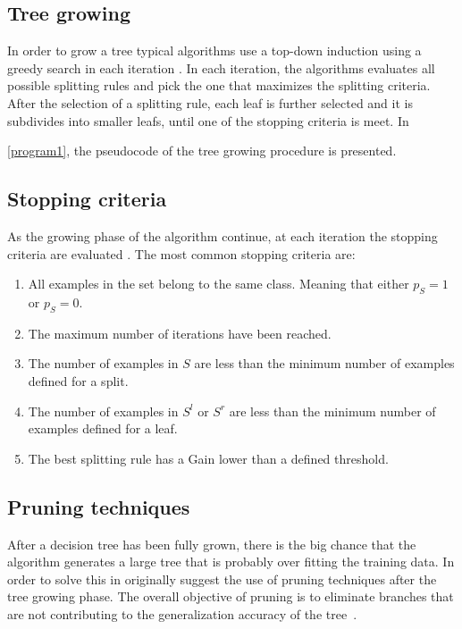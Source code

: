  \subsection{Tree growing}
 In order to grow a tree typical algorithms use a top-down induction using a greedy search in each
 iteration \citep{Rokach2010}. In each iteration, the algorithms evaluates all possible splitting 
rules
 and pick the one that maximizes the splitting criteria. After the selection of a splitting rule,
 each leaf is further selected and it is subdivides into smaller leafs, until one of the stopping 
criteria is meet.
 In \figurename{ \ref{program1}, the pseudocode of the tree growing procedure is presented.

  
   \subsection{Stopping criteria}
 As the growing phase of the algorithm continue, at each iteration the stopping criteria are 
evaluated \citep{Rokach2010}.
 The most common stopping criteria are:
 \begin{enumerate}
  \item All examples in the set belong to the same class.
  Meaning that either $p_S=1$ or $p_S=0$.

  \item The maximum number of iterations have been reached.
  
  \item The number of examples in $S$ are less than the minimum number of examples defined for a 
split.
  
  \item The number of examples in $S^l$ or $S^r$ are less than the minimum number of examples 
defined for a leaf.
  
  \item The best splitting rule has a Gain lower than a defined threshold.
  
 \end{enumerate}
 
\subsection{Pruning techniques}
 After a decision tree has been fully grown, there is the big chance that 
 the algorithm generates a large tree that is probably over fitting the
 training data. In order to solve this in \citep{Breiman1984a} originally suggest
 the use of pruning techniques after the tree growing phase.
 The overall objective of pruning is to eliminate branches that are not contributing
 to the generalization accuracy of the \mbox{tree \citep{Rokach2010}.}
 
}
